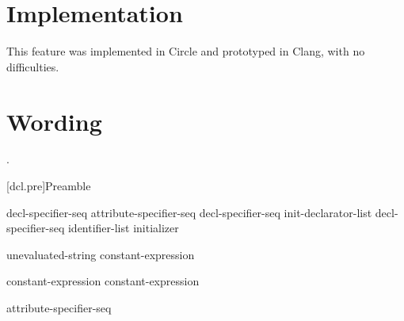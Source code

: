 \documentclass{wg21}
\begin{document}
\section{Implementation}

This feature was implemented in Circle and prototyped in Clang, with no difficulties.

\section{Wording}

.



[dcl.pre]{Preamble}

\begin{bnf}
    \br
    decl-specifier-seq  \terminal{;}\br
    attribute-specifier-seq decl-specifier-seq init-declarator-list \terminal{;}\br
     decl-specifier-seq  \terminal{[} identifier-list \terminal{]} initializer \terminal{;}
\end{bnf}

\begin{addedblock}
\begin{bnf}
    \br
        unevaluated-string\br
        constant-expression\br
\end{bnf}
\end{addedblock}

\begin{bnf}
    \br
     \terminal{(} constant-expression \terminal{)} \terminal{;}\br
     \terminal{(} constant-expression \terminal{,}  \terminal{)} \terminal{;}\br
\end{bnf}

\begin{bnf}
    \br
    \terminal{;}
\end{bnf}

\begin{bnf}
    \br
    attribute-specifier-seq \terminal{;}
\end{bnf}
\end{document}
